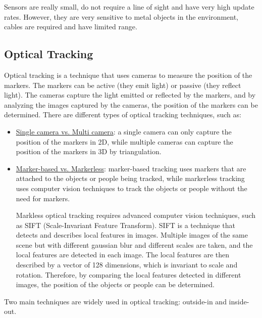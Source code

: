 Sensors are really small, do not require a line of sight and have very high update rates. However, they are very sensitive to metal objects in the environment, cables are required and have limited range.


\subsection{Optical Tracking}

Optical tracking is a technique that uses cameras to measure the position of the markers. The markers can be active (they emit light) or passive (they reflect light). The cameras capture the light emitted or reflected by the markers, and by analyzing the images captured by the cameras, the position of the markers can be determined. There are different types of optical tracking techniques, such as:
\begin{itemize}
    \item \ul{Single camera vs. Multi camera}: a single camera can only capture the position of the markers in 2D, while multiple cameras can capture the position of the markers in 3D by triangulation.
    \item \ul{Marker-based vs. Markerless}: marker-based tracking uses markers that are attached to the objects or people being tracked, while markerless tracking uses computer vision techniques to track the objects or people without the need for markers.
    
    Markless optical tracking requires advanced computer vision techniques, such as SIFT (Scale-Invariant Feature Transform). SIFT is a technique that detects and describes local features in images. Multiple images of the same scene but with different gaussian blur and different scales are taken, and the local features are detected in each image. The local features are then described by a vector of 128 dimensions, which is invariant to scale and rotation. Therefore, by comparing the local features detected in different images, the position of the objects or people can be determined.
\end{itemize}


Two main techniques are widely used in optical tracking: outside-in and inside-out.
